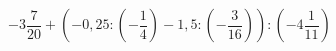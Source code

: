 \begin{ex}[type=calculate]
	\begin{condition}
		\( -3\dfrac{7}{20}+\left( -0,25:\left( -\dfrac{1}{4} \right)-1,5:\left( -\dfrac{3}{16} \right) \right):\left( -4\dfrac{1}{11} \right) \)
	\end{condition}
	\answer{}
\end{ex}